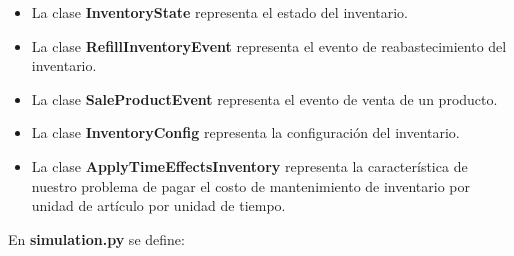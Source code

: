 \documentclass{article}
\begin{document}
\begin{itemize}
    \item La clase \textbf{InventoryState} representa el estado del inventario.
    \item La clase \textbf{RefillInventoryEvent} representa el evento de reabastecimiento del inventario.
    \item La clase \textbf{SaleProductEvent} representa el evento de venta de un producto.
    \item La clase \textbf{InventoryConfig} representa la configuración del inventario.
    \item La clase \textbf{ApplyTimeEffectsInventory} representa la característica de nuestro problema de pagar el costo de
  mantenimiento de inventario por unidad de artículo por unidad de tiempo.
\end{itemize}

En \textbf{simulation.py} se define:
\end{document}
